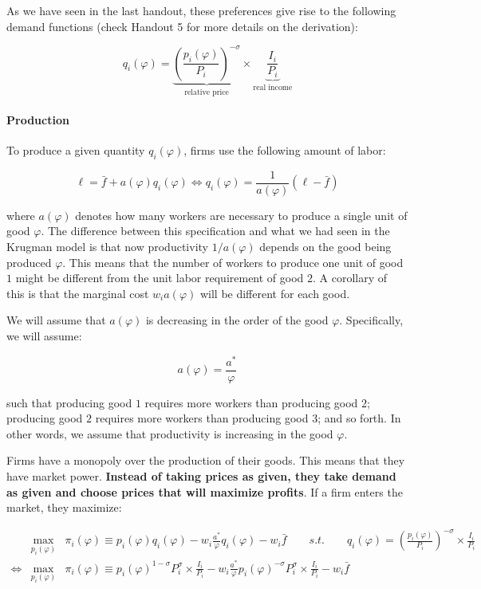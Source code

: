 \documentclass[11pt,letterpaper]{article}
\begin{document}
As we have seen in the last handout, these preferences give rise to the following demand functions (check Handout 5 for more details on the derivation):

\begin{equation*}
\boxed{
    q_i(\varphi) = \underbrace{\left( \frac{p_i(\varphi)}{P_i} \right)^{-\sigma}}_{\text{relative price}} \times \underbrace{\frac{I_i}{P_i}}_{\text{real income}}}
\end{equation*}

\paragraph{Production} To produce a given quantity $q_i(\varphi)$, firms use the following amount of labor:

\begin{equation*}
     \ell = \bar{f} + a(\varphi)q_i(\varphi) \iff q_i(\varphi) = \frac{1}{a(\varphi)} (\ell - \bar{f})
\end{equation*}

where $a(\varphi)$ denotes how many workers are necessary to produce a single unit of good $\varphi$. The difference between this specification and what we had seen in the Krugman model is that now productivity $1/a(\varphi)$ depends on the good being produced $\varphi$. This means that the number of workers to produce one unit of good $1$ might be different from the unit labor requirement of good $2$. A corollary of this is that the marginal cost $w_i a(\varphi)$ will be different for each good.

We will assume that $a(\varphi)$ is decreasing in the order of the good $\varphi$. Specifically, we will assume:

\begin{equation*}
    a(\varphi) = \frac{a^*}{\varphi}
\end{equation*}

\noindent such that producing good $1$ requires more workers than producing good $2$; producing good $2$ requires more workers than producing good $3$; and so forth. In other words, we assume that productivity is increasing in the good $\varphi$. 

Firms have a monopoly over the production of their goods. This means that they have market power. \textbf{Instead of taking prices as given, they take demand as given and choose prices that will maximize profits}. If a firm enters the market, they maximize:

\begin{eqnarray*}
    &\max_{p_i(\varphi)}& \pi_i(\varphi) \equiv p_i(\varphi) q_i(\varphi) - w_i \frac{a^*}{\varphi} q_i(\varphi) - w_i \bar{f} \qquad s.t. \qquad   q_i(\varphi) = \left( \frac{p_i(\varphi)}{P_i} \right)^{-\sigma}  \times \frac{I_i}{P_i} \\
\iff &\max_{p_i(\varphi)}&  \pi_i(\varphi) \equiv p_i(\varphi)^{1-\sigma} P_i^{\sigma}  \times \frac{I_i}{P_i} - w_i \frac{a^*}{\varphi} p_i(\varphi)^{-\sigma} P_i^{\sigma}  \times \frac{I_i}{P_i} - w_i \bar{f} 
\end{eqnarray*}
\end{document}
